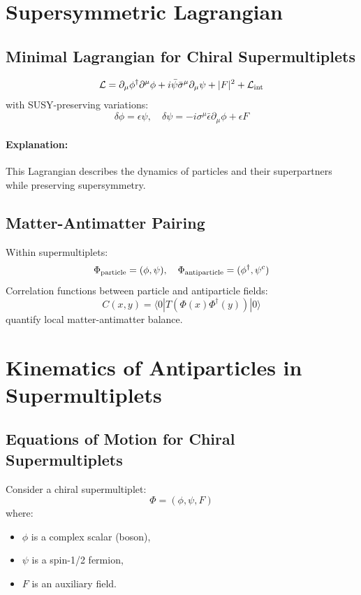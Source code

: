 \documentclass[12pt,a4paper]{article}
\begin{document}
\section{Supersymmetric Lagrangian}
\subsection{Minimal Lagrangian for Chiral Supermultiplets}
\begin{equation}
\mathcal{L} = \partial_\mu \phi^\dagger \partial^\mu \phi + i \bar\psi \bar\sigma^\mu \partial_\mu \psi + |F|^2 + \mathcal{L}_{\rm int}
\end{equation}
with SUSY-preserving variations:
\[
\delta \phi = \epsilon \psi, \quad \delta \psi = -i\sigma^\mu \bar\epsilon \partial_\mu \phi + \epsilon F
\]

\paragraph{Explanation:} This Lagrangian describes the dynamics of particles and their superpartners while preserving supersymmetry.

\subsection{Matter-Antimatter Pairing}
Within supermultiplets:
\[
\Phi_{\rm particle} = (\phi, \psi), \quad \Phi_{\rm antiparticle} = (\phi^\dagger, \psi^c)
\]
Correlation functions between particle and antiparticle fields:
\begin{equation}
C(x,y) = \langle 0 | T(\Phi(x) \Phi^\dagger(y)) | 0 \rangle
\end{equation}
quantify local matter-antimatter balance.
\section{Kinematics of Antiparticles in Supermultiplets}

\subsection{Equations of Motion for Chiral Supermultiplets}

Consider a chiral supermultiplet:
\[
\Phi = (\phi, \psi, F)
\]
where:
\begin{itemize}
    \item \(\phi\) is a complex scalar (boson),
    \item \(\psi\) is a spin-1/2 fermion,
    \item \(F\) is an auxiliary field.
\end{itemize}
\end{document}
